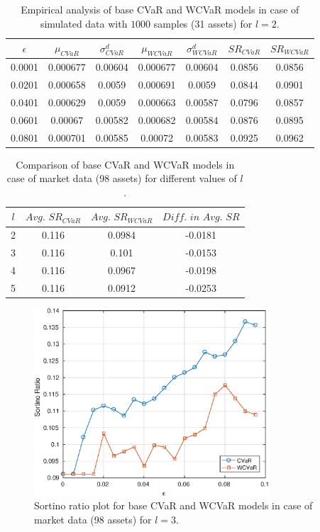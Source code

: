 \documentclass[12pt]{article}
\numberwithin{equation}{section}
\begin{document}
\begin{table}[!h]
\centering
\captionsetup{justification=centering}
\begin{tabular}{||c|c|c|c|c|c|c||}
\hline
$\epsilon$ & $\mu_{CVaR}$ & $\sigma_{CVaR}^{d}$ & $\mu_{WCVaR}$ & $\sigma_{WCVaR}^{d}$ & $SR_{CVaR}$ & $SR_{WCVaR}$\\
\hline
0.0001 & 0.000677 & 0.00604 & 0.000677 & 0.00604 & 0.0856 & 0.0856 \\
0.0201 & 0.000658 & 0.0059 & 0.000691 & 0.0059 & 0.0844 & 0.0901 \\
0.0401 & 0.000629 & 0.0059 & 0.000663 & 0.00587 & 0.0796 & 0.0857 \\
0.0601 & 0.00067 & 0.00582 & 0.000682 & 0.00584 & 0.0876 & 0.0895 \\
0.0801 & 0.000701 & 0.00585 & 0.00072 & 0.00583 & 0.0925 & 0.0962 \\
\hline
\end{tabular}
\caption{Empirical analysis of base CVaR and WCVaR models in case of simulated data with $1000$ samples (31 assets) for $l=2$.}
\label{tab:6.3}
\end{table}

\begin{table}[!h]
\centering
\captionsetup{justification=centering}
\begin{tabular}{||c|c|c|c||}
\hline
$l$ & $Avg. \, \, SR_{CVaR}$ & $Avg. \, \, SR_{WCVaR}$ & $Diff. \, \, in \, \, Avg. \, \, SR$ \\
\hline
2 & 0.116 & 0.0984 & -0.0181 \\
3 & 0.116 & 0.101 & -0.0153 \\
4 & 0.116 & 0.0967 & -0.0198 \\
5 & 0.116 & 0.0912 & -0.0253 \\
\hline
\end{tabular}
\caption{Comparison of base CVaR and WCVaR models in case of market data (98 assets) for different values of $l$.}
\label{avgtab:6.4}
\end{table}

\begin{figure}[!h]
\centering
\includegraphics[height=7.0cm]{cvar_100m_3.eps}
\caption{Sortino ratio plot for base CVaR and WCVaR models in case of market data (98 assets) for $l=3$.}
\label{fig:6.4}
\end{figure}
\end{document}
